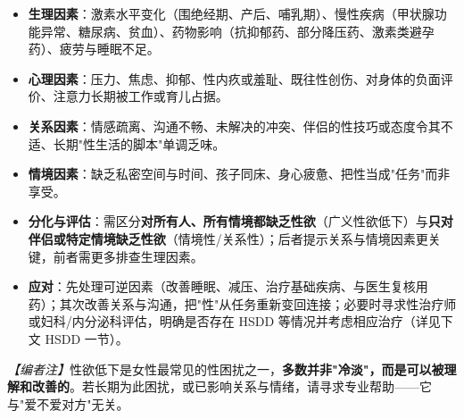 \begin{itemize}
	\item \textbf{生理因素}：激素水平变化（围绝经期、产后、哺乳期）、慢性疾病（甲状腺功能异常、糖尿病、贫血）、药物影响（抗抑郁药、部分降压药、激素类避孕药）、疲劳与睡眠不足。
	\item \textbf{心理因素}：压力、焦虑、抑郁、性内疚或羞耻、既往性创伤、对身体的负面评价、注意力长期被工作或育儿占据。
	\item \textbf{关系因素}：情感疏离、沟通不畅、未解决的冲突、伴侣的性技巧或态度令其不适、长期"性生活的脚本"单调乏味。
	\item \textbf{情境因素}：缺乏私密空间与时间、孩子同床、身心疲惫、把性当成"任务"而非享受。
	\item \textbf{分化与评估}：需区分\textbf{对所有人、所有情境都缺乏性欲}（广义性欲低下）与\textbf{只对伴侣或特定情境缺乏性欲}（情境性/关系性）；后者提示关系与情境因素更关键，前者需更多排查生理因素。
	\item \textbf{应对}：先处理可逆因素（改善睡眠、减压、治疗基础疾病、与医生复核用药）；其次改善关系与沟通，把"性"从任务重新变回连接；必要时寻求性治疗师或妇科/内分泌科评估，明确是否存在 HSDD 等情况并考虑相应治疗（详见下文 HSDD 一节）。
\end{itemize}

\noindent\textit{【编者注】}性欲低下是女性最常见的性困扰之一，\textbf{多数并非"冷淡"，而是可以被理解和改善的}。若长期为此困扰，或已影响关系与情绪，请寻求专业帮助——它与"爱不爱对方"无关。

